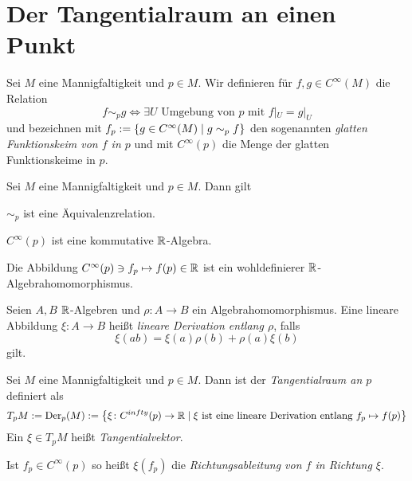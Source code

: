 \section{Der Tangentialraum an einen Punkt}
\label{sec:tpm}

\begin{definition}
  Sei $M$ eine Mannigfaltigkeit und $p\in M$. Wir definieren für $f,g
  \in C^\infty(M)$ die Relation
  \begin{equation*}
    f \sim_p g \iff \exists U\text{ Umgebung von $p$ mit } f|_U = g|_U
  \end{equation*}
  und bezeichnen mit $f_p := \left\lbrace g\in C^\infty(M) \mid g\sim_p f \right\rbrace$
  den sogenannten \emph{glatten Funktionskeim von $f$ in $p$} und mit
  $C^\infty(p)$ die Menge der glatten Funktionskeime in $p$.
\end{definition}

\begin{proposition}
  Sei $M$ eine Mannigfaltigkeit und $p\in M$. Dann gilt
  \begin{statements}
  \item $\sim_p$ ist eine Äquivalenzrelation.
  \item $C^\infty(p)$ ist eine kommutative $\mathbb{R}$-Algebra.
  \item Die Abbildung $C^\infty(p) \ni f_p \mapsto f(p) \in \mathbb{R}$ ist
    ein wohldefinierer $\mathbb{R}$-Algebrahomomorphismus. 
  \end{statements}
\end{proposition}

\begin{definition}
  Seien $A,B$ $\mathbb{R}$-Algebren und $\rho \colon A \to B$ ein
  Algebrahomomorphismus. Eine lineare Abbildung $\xi \colon A \to B$
  heißt \emph{lineare Derivation entlang $\rho$}, falls
  \begin{equation*}
    \xi(ab) = \xi(a)\rho(b) + \rho(a)\xi(b)
  \end{equation*}
  gilt.
\end{definition}

\begin{definition}
  Sei $M$ eine Mannigfaltigkeit und $p\in M$. Dann ist der
  \emph{Tangentialraum an $p$} definiert als
  \begin{equation*}
    T_pM := \operatorname{Der}_p(M) := \left\lbrace  \xi \colon C^{infty}(p) \to \mathbb{R}\mid
      \xi\text{ ist eine lineare Derivation entlang $f_p \mapsto f(p)$} \right\rbrace
  \end{equation*}
  Ein $\xi \in T_pM$ heißt \emph{Tangentialvektor}.

  Ist $f_p\in C^\infty(p)$ so heißt $\xi(f_p)$ die
  \emph{Richtungsableitung von $f$ in Richtung $\xi$}.
\end{definition}

